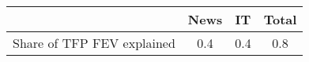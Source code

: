\begin{small}
	\begin{tabular}{lccc}
	\hline
		& News & IT & Total \\
		\hline
		Share of TFP FEV explained & 0.4 & 0.4 & 0.8 \\
		\hline
	\end{tabular}
\end{small}
